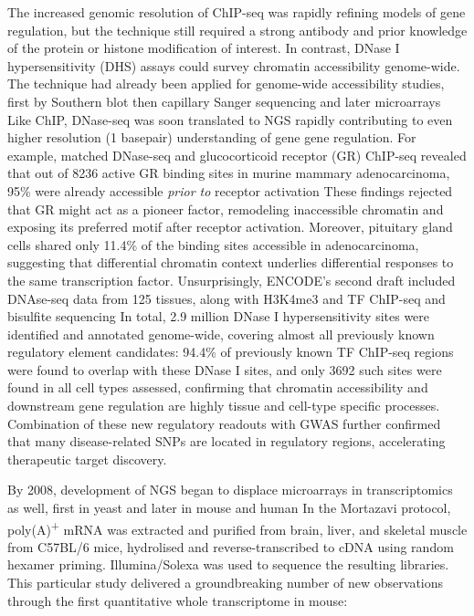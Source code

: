 The increased genomic resolution of ChIP-seq was rapidly refining models of gene regulation, but the technique still required a strong antibody and prior knowledge of the protein or histone modification of interest. In contrast, DNase I hypersensitivity (DHS) assays could survey chromatin accessibility genome-wide. The technique had already been applied for genome-wide accessibility studies, first by Southern blot then capillary Sanger sequencing and later microarrays Like ChIP, DNase-seq was soon translated to NGS rapidly contributing to even higher resolution (1 basepair) understanding of gene gene regulation. For example, matched DNase-seq and glucocorticoid receptor (GR) ChIP-seq revealed that out of \num{8236} active GR binding sites in murine mammary adenocarcinoma, 95\% were already accessible \textit{prior to} receptor activation These findings rejected that GR might act as a pioneer factor, remodeling inaccessible chromatin and exposing its preferred motif after receptor activation. Moreover, pituitary gland cells shared only 11.4\% of the binding sites accessible in adenocarcinoma, suggesting that differential chromatin context underlies differential responses to the same transcription factor. Unsurprisingly, ENCODE's second draft included DNAse-seq data from 125 tissues, along with H3K4me3 and TF ChIP-seq and bisulfite sequencing In total, 2.9 million DNase I hypersensitivity sites were identified and annotated genome-wide, covering almost all previously known regulatory element candidates: 94.4\% of previously known TF ChIP-seq regions were found to overlap with these DNase I sites, and only \num{3692} such sites were found in all cell types assessed, confirming that chromatin accessibility and downstream gene regulation are highly tissue and cell-type specific processes. Combination of these new regulatory readouts with GWAS further confirmed that many disease-related SNPs are located in regulatory regions, accelerating therapeutic target discovery.

By 2008, development of NGS began to displace microarrays in transcriptomics as well, first in yeast and later in mouse and human In the Mortazavi protocol, poly(A)\textsuperscript{+} mRNA was extracted and purified from brain, liver, and skeletal muscle from C57BL/6 mice, hydrolised and reverse-transcribed to cDNA using random hexamer priming. Illumina/Solexa was used to sequence the resulting libraries. This particular study delivered a groundbreaking number of new observations through the first quantitative whole transcriptome in mouse:

